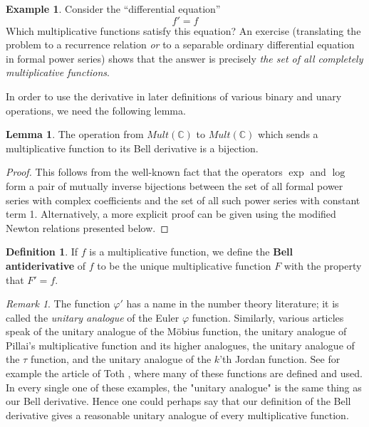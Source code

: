\documentclass[a4paper]{article}
\theoremstyle{definition}
\newtheorem{definition}{Definition}[section]
\newtheorem{example}{Example}[section]
\newtheorem{lemma}[theorem]{Lemma}
\theoremstyle{remark}
\newtheorem*{remark}{Remark}
\newcommand{\C}{\mathbb{C}}
\newcommand{\defhl}[1]{\textbf{#1}}
\begin{document}
\begin{example}
Consider the ``differential equation''
$$ f' = f   $$
Which multiplicative functions satisfy this equation? An exercise (translating the problem to a recurrence relation \emph{or} to a separable ordinary differential equation in formal power series) shows that the answer is precisely \emph{the set of all completely multiplicative functions}.
\end{example}

In order to use the derivative in later definitions of various binary and unary operations, we need the following lemma.

\begin{lemma}
The operation from $Mult(\C)$ to $Mult(\C)$ which sends a multiplicative function to its Bell derivative is a bijection.
\end{lemma}

\begin{proof}
This follows from the well-known fact that the operators $\exp$ and $\log$ form a pair of mutually inverse bijections between the set of all formal power series with complex coefficients and the set of all such power series with constant term 1. Alternatively, a more explicit proof can be given using the modified Newton relations presented below.
\end{proof}

\begin{definition}
If $f$ is a multiplicative function, we define the \defhl{Bell antiderivative} of $f$ to be the unique multiplicative function $F$ with the property that $F' = f$.
\end{definition}

\begin{remark}
The function $\varphi'$ has a name in the number theory literature; it is called the \emph{unitary analogue} of the Euler $\varphi$ function. Similarly, various articles speak of the unitary analogue of the M{\"o}bius function, the unitary analogue of Pillai's multiplicative function and its higher analogues, the unitary analogue of the $\tau$ function, and the unitary analogue of the $k$'th Jordan function. See for example the article of Toth \cite{Toth}, where many of these functions are defined and used. In every single one of these examples, the "unitary analogue" is the same thing as our Bell derivative. Hence one could perhaps say that our definition of the Bell derivative gives a reasonable unitary analogue of every multiplicative function. 
\end{remark}
\end{document}
